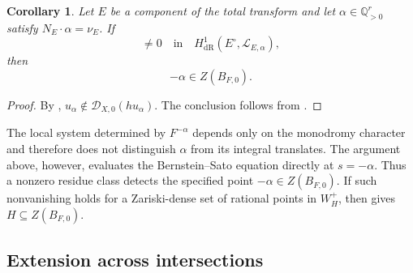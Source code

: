 \documentclass[12pt]{amsart}
\numberwithin{equation}{section}
\theoremstyle{plain}
\newtheorem{corollary}[theorem]{Corollary}
\theoremstyle{definition}
\theoremstyle{remark}
\theoremstyle{definition}
\newcommand{\Q}{\mathbb Q}
\newcommand{\D}{\mathscr D}
\newcommand{\Lcal}{\mathscr L}
\begin{document}
\begin{corollary}\label{cor:residue-gives-Bernstein-point}
Let $E$ be a component of the total transform and let $\alpha\in\Q_{>0}^r$ satisfy $N_E\cdot\alpha=\nu_E$. If
\begin{equation*}
[R_{E,\alpha}]\neq0\quad\text{in}\quad H^1_{\mathrm{dR}}(E^\circ,\Lcal_{E,\alpha}),
\end{equation*}
then
\begin{equation*}
-\alpha\in Z(B_{F,0}).
\end{equation*}
\end{corollary}

\begin{proof}
By , $u_\alpha\notin\D_{X,0}(hu_\alpha)$. The conclusion follows from .
\end{proof}

The local system determined by $F^{-\alpha}$ depends only on the monodromy character and therefore does not distinguish $\alpha$ from its integral translates. The argument above, however, evaluates the Bernstein--Sato equation directly at $s=-\alpha$. Thus a nonzero residue class detects the specified point $-\alpha\in Z(B_{F,0})$. If such nonvanishing holds for a Zariski-dense set of rational points in $W_H^+$, then  gives $H\subseteq Z(B_{F,0})$. 

\subsection{Extension across intersections}\label{subsec:residue-one}
\end{document}
